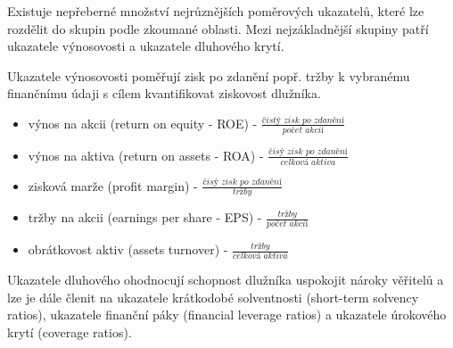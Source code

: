 \documentclass[a4paper]{book}
\begin{document}
Existuje nepřeberné množství nejrůznějších poměrových ukazatelů, které lze rozdělit do skupin podle zkoumané oblasti. Mezi nejzákladnější skupiny patří ukazatele výnosovosti a ukazatele dluhového krytí.

Ukazatele výnosovosti poměřují zisk po zdanění popř. tržby k vybranému finančnímu údaji s cílem kvantifikovat ziskovost dlužníka.
\begin{itemize}
\item výnos na akcii (return on equity - ROE) - $\frac{\textit{\v{c}ist\'{y} zisk po zdan\v{e}n\'{i}}}{\textit{po\v{c}et akci\'{i}}}$
\item výnos na aktiva (return on assets - ROA) - $\frac{\textit{\v{c}is\'{y} zisk po zdan\v{e}n\'{i}}}{\textit{celkov\'{a} aktiva}}$
\item zisková marže (profit margin) - $\frac{\textit{\v{c}is\'{y} zisk po zdan\v{e}n\'{i}}}{\textit{tr\v{z}by}}$
\item tržby na akcii (earnings per share - EPS) - $\frac{\textit{tr\v{z}by}}{\textit{po\v{c}et akci\'{i}}}$
\item obrátkovost aktiv (assets turnover) - $\frac{\textit{tr\v{z}by}}{\textit{celkov\'{a} aktiva}}$
\end{itemize}
Ukazatele dluhového ohodnocují schopnost dlužníka uspokojit nároky věřitelů a lze je dále členit na ukazatele krátkodobé solventnosti (short-term solvency ratios), ukazatele finanční páky (financial leverage ratios) a ukazatele úrokového krytí (coverage ratios).
\end{document}
